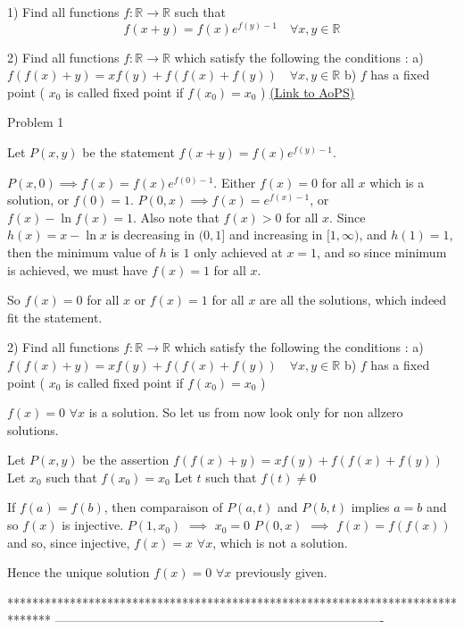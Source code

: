 \begin{problem}
	1) Find all functions $f:\mathbb{R}\to\mathbb{R}$ such that
\[f(x+y)=f(x)e^{f(y)-1}   \quad \forall x,y\in\mathbb{R}\]

2) Find all functions $f:\mathbb{R}\to\mathbb{R}$ which satisfy the following the conditions :
a) $f(f(x)+y)=xf(y)+f\left(f(x)+f(y)\right)  \quad \forall x,y\in\mathbb{R}$
b) $f$ has a fixed point  ( $x_0$ is called fixed point if $f(x_{0})=x_{0}$ )
	\flushright \href{https://artofproblemsolving.com/community/c6h562844}{(Link to AoPS)}
\end{problem}



\begin{solution}
	Problem 1

Let $P(x,y)$ be the statement $f(x+y) = f(x) e^{f(y)-1}$.

$P(x,0) \implies f(x) = f(x)e^{f(0)-1}$. Either $f(x) = 0$ for all $x$ which is a solution, or $f(0) = 1$.
$P(0,x) \implies f(x) = e^{f(x)-1}$, or $f(x) - \ln f(x) = 1$. Also note that $f(x) > 0$ for all $x$. Since $h(x) = x - \ln x$ is decreasing in $(0,1]$ and increasing in $[1, \infty)$, and $h(1) = 1$, then the minimum value of $h$ is $1$ only achieved at $x=1$, and so since minimum is achieved, we must have $f(x) = 1$ for all $x$.

So $f(x) = 0$ for all $x$ or $f(x) = 1$ for all $x$ are all the solutions, which indeed fit the statement.
\end{solution}



\begin{solution}
	\begin{tcolorbox}2) Find all functions $f:\mathbb{R}\to\mathbb{R}$ which satisfy the following the conditions :
a) $f(f(x)+y)=xf(y)+f\left(f(x)+f(y)\right)  \quad \forall x,y\in\mathbb{R}$
b) $f$ has a fixed point  ( $x_0$ is called fixed point if $f(x_{0})=x_{0}$ )\end{tcolorbox}
$\boxed{f(x)=0}$ $\forall x$ is a solution. So let us from now look only for non allzero solutions.

Let $P(x,y)$ be the assertion $f(f(x)+y)=xf(y)+f(f(x)+f(y))$
Let $x_0$ such that $f(x_0)=x_0$
Let $t$ such that $f(t)\ne 0$

If $f(a)=f(b)$, then comparaison of $P(a,t)$ and $P(b,t)$ implies $a=b$ and so $f(x)$ is injective.
$P(1,x_0)$ $\implies$ $x_0=0$
$P(0,x)$ $\implies$ $f(x)=f(f(x))$ and so, since injective, $f(x)=x$ $\forall x$, which is not a solution.

Hence the unique solution $f(x)=0$ $\forall x$ previously given.
\end{solution}
*******************************************************************************
-------------------------------------------------------------------------------

